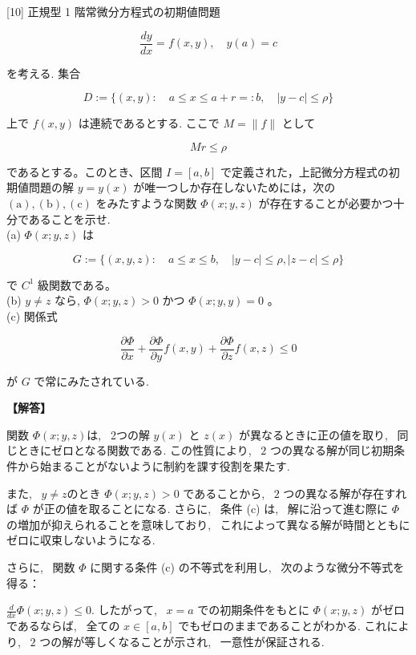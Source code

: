 \documentclass{jsarticle}
\begin{document}
\begin{itembox}[l]{[10]}
正規型 1 階常微分方程式の初期値問題


\begin{equation*}
\frac{d y}{d x}=f(x, y), \quad y(a)=c \tag{22}
\end{equation*}


を考える. 集合


\begin{equation*}
D:=\{(x, y): \quad a \leqslant x \leqslant a+r=: b, \quad|y-c| \leqslant \rho\} \tag{23}
\end{equation*}


上で $f(x, y)$ は連続であるとする. ここで $M=\|f\|$ として


\begin{equation*}
M r \leqslant \rho \tag{24}
\end{equation*}


であるとする。このとき、区間 $I=[a, b]$ で定義された，上記微分方程式の初期値問題の解 $y=y(x)$ が唯一つしか存在しないためには，次の $(\mathrm{a}),(\mathrm{b}),(\mathrm{c})$ をみたすような関数 $\Phi(x ; y, z)$ が存在することが必要かつ十分であることを示せ.\\
(a) $\Phi(x ; y, z)$ は


\begin{equation*}
G:=\{(x, y, z): \quad a \leqslant x \leqslant b, \quad|y-c| \leqslant \rho,|z-c| \leqslant \rho\} \tag{25}
\end{equation*}


で $C^{1}$ 級関数である。\\
(b) $y \neq z$ なら, $\Phi(x ; y, z)>0$ かつ $\Phi(x ; y, y)=0$ 。\\
(c) 関係式


\begin{equation*}
\frac{\partial \Phi}{\partial x}+\frac{\partial \Phi}{\partial y} f(x, y)+\frac{\partial \Phi}{\partial z} f(x, z) \leqslant 0 \tag{26}
\end{equation*}


が $G$ で常にみたされている.
\end{itembox}

\noindent
\textbf{【解答】}

関数 $\Phi(x ; y, z)$は, \ 2つの解 $y(x)$ と $z(x)$ 
が異なるときに正の値を取り, \ 同じときにゼロとなる関数である. この性質により, \ $2$ つの異なる解が同じ初期条件から始まることがないように制約を課す役割を果たす.

また, \ $y \neq z$のとき $\Phi(x ; y, z) > 0$ であることから, \ $2$ つの異なる解が存在すれば $\Phi$ が正の値を取ることになる. さらに, \ 条件 (c) は, \ 解に沿って進む際に $\Phi$ の増加が抑えられることを意味しており, \ これによって異なる解が時間とともにゼロに収束しないようになる.

さらに, \ 関数 $\Phi$ に関する条件 (c) の不等式を利用し, \ 次のような微分不等式を得る：

$\displaystyle \frac{d}{dx} \Phi(x ; y, z) \le 0$.
したがって, \ $x = a$ での初期条件をもとに $\Phi(x ; y, z)$ がゼロであるならば, \ 全ての $x \in [a, b]$ でもゼロのままであることがわかる. これにより, \ $2$ つの解が等しくなることが示され, \ 一意性が保証される.
\end{document}
